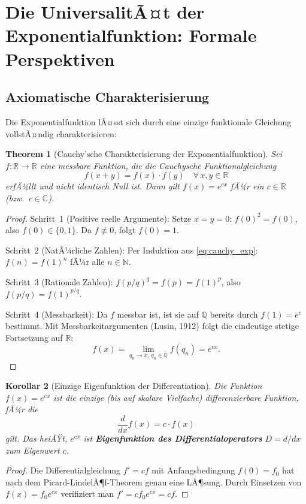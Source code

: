 ﻿\documentclass[12pt,a4paper]{article}
\newtheorem{theorem}{Theorem}[section]
\newtheorem{corollary}[theorem]{Korollar}
\theoremstyle{definition}
\theoremstyle{remark}
\begin{document}
\section{Die UniversalitÃ¤t der Exponentialfunktion: Formale Perspektiven}
\label{sec:exponential_universal}

\subsection{Axiomatische Charakterisierung}

Die Exponentialfunktion lÃ¤sst sich durch eine einzige funktionale Gleichung vollstÃ¤ndig charakterisieren:

\begin{theorem}[Cauchy'sche Charakterisierung der Exponentialfunktion]
\label{thm:cauchy_exp}
Sei $f: \mathbb{R} \to \mathbb{R}$ eine messbare Funktion, die die Cauchysche Funktionalgleichung
\begin{equation}
f(x + y) = f(x)\cdot f(y) \quad \forall\, x,y \in \mathbb{R}
\label{eq:cauchy_exp}
\end{equation}
erfÃ¼llt und nicht identisch Null ist. Dann gilt $f(x) = e^{cx}$ fÃ¼r ein $c \in \mathbb{R}$ (bzw.\ $c \in \mathbb{C}$).
\end{theorem}
\begin{proof}
Schritt~1 (Positive reelle Argumente): Setze $x=y=0$: $f(0)^2 = f(0)$, also $f(0) \in \{0,1\}$. Da $f \not\equiv 0$, folgt $f(0) = 1$.

Schritt~2 (NatÃ¼rliche Zahlen): Per Induktion aus \eqref{eq:cauchy_exp}: $f(n) = f(1)^n$ fÃ¼r alle $n \in \mathbb{N}$.

Schritt~3 (Rationale Zahlen): $f(p/q)^q = f(p) = f(1)^p$, also $f(p/q) = f(1)^{p/q}$.

Schritt~4 (Messbarkeit): Da $f$ messbar ist, ist sie auf $\mathbb{Q}$ bereits durch $f(1) = e^c$ bestimmt. Mit Messbarkeitargumenten (Lusin, 1912) folgt die eindeutige stetige Fortsetzung auf $\mathbb{R}$:
\[
f(x) = \lim_{q_n \to x,\, q_n \in \mathbb{Q}} f(q_n) = e^{cx}. 
\]
\end{proof}

\begin{corollary}[Einzige Eigenfunktion der Differentiation]
\label{cor:eigenfunktion}
Die Funktion $f(x) = e^{cx}$ ist die einzige (bis auf skalare Vielfache) differenzierbare Funktion, fÃ¼r die
\begin{equation}
\frac{d}{dx}f(x) = c\cdot f(x)
\end{equation}
gilt. Das heiÃŸt, $e^{cx}$ ist \textbf{Eigenfunktion des Differentialoperators} $D = d/dx$ zum Eigenwert $c$.
\end{corollary}
\begin{proof}
Die Differentialgleichung $f' = cf$ mit Anfangsbedingung $f(0) = f_0$ hat nach dem Picard-LindelÃ¶f-Theorem genau eine LÃ¶sung. Durch Einsetzen von $f(x) = f_0 e^{cx}$ verifiziert man $f' = cf_0e^{cx} = cf$. 
\end{proof}
\end{document}
